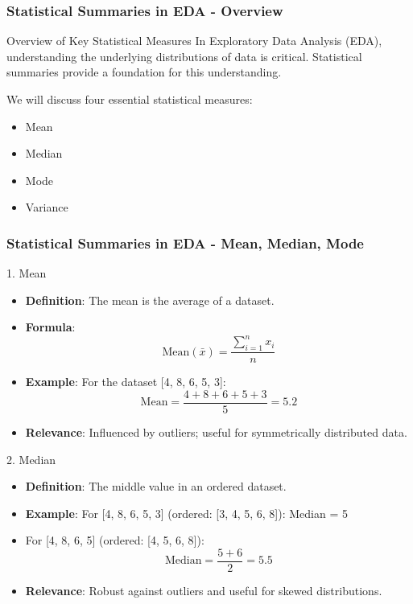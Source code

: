 \documentclass{beamer}
\begin{document}
\begin{frame}[fragile]
    \frametitle{Statistical Summaries in EDA - Overview}
    \begin{block}{Overview of Key Statistical Measures}
        In Exploratory Data Analysis (EDA), understanding the underlying distributions of data is critical. Statistical summaries provide a foundation for this understanding.
    \end{block}
    We will discuss four essential statistical measures:
    \begin{itemize}
        \item Mean
        \item Median
        \item Mode
        \item Variance
    \end{itemize}
\end{frame}

\begin{frame}[fragile]
    \frametitle{Statistical Summaries in EDA - Mean, Median, Mode}
    \begin{block}{1. Mean}
        \begin{itemize}
            \item \textbf{Definition}: The mean is the average of a dataset.
            \item \textbf{Formula}:
            \begin{equation}
                \text{Mean} (\bar{x}) = \frac{\sum_{i=1}^{n} x_i}{n}
            \end{equation}
            \item \textbf{Example}: For the dataset [4, 8, 6, 5, 3]:
            \begin{equation}
                \text{Mean} = \frac{4+8+6+5+3}{5} = 5.2
            \end{equation}
            \item \textbf{Relevance}: Influenced by outliers; useful for symmetrically distributed data.
        \end{itemize}
    \end{block}

    \begin{block}{2. Median}
        \begin{itemize}
            \item \textbf{Definition}: The middle value in an ordered dataset.
            \item \textbf{Example}: For [4, 8, 6, 5, 3] (ordered: [3, 4, 5, 6, 8]): Median = 5
            \item For [4, 8, 6, 5] (ordered: [4, 5, 6, 8]): 
            \begin{equation}
                \text{Median} = \frac{5 + 6}{2} = 5.5
            \end{equation}
            \item \textbf{Relevance}: Robust against outliers and useful for skewed distributions.
        \end{itemize}
    \end{block}
\end{frame}
\end{document}

